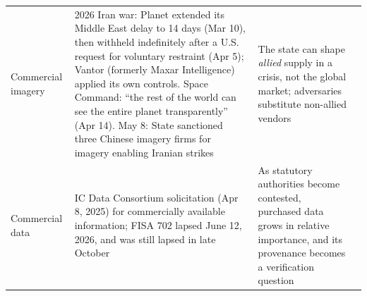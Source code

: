 \documentclass[11pt,letterpaper]{article}
\begin{document}
\begin{center}
\scriptsize
\begin{tabularx}{\linewidth}{ZY{0.44}Y{1.49}Y{1.07}}
Commercial imagery & 2026 Iran war: Planet extended its Middle East delay to 14 days (Mar 10), then withheld indefinitely after a U.S. request for voluntary restraint (Apr 5); Vantor (formerly Maxar Intelligence) applied its own controls. Space Command: ``the rest of the world can see the entire planet transparently'' (Apr 14). May 8: State sanctioned three Chinese imagery firms for imagery enabling Iranian strikes & The state can shape \textit{allied} supply in a crisis, not the global market; adversaries substitute non-allied vendors \\
Commercial data & IC Data Consortium solicitation (Apr 8, 2025) for commercially available information; FISA 702 lapsed June 12, 2026, and was still lapsed in late October & As statutory authorities become contested, purchased data grows in relative importance, and its provenance becomes a verification question \\
\end{tabularx}
\end{center}
\end{document}
